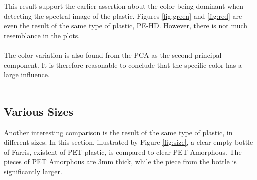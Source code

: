 
\noindent
This result support the earlier assertion about the color being dominant when detecting the spectral image of the plastic. Figures \ref{fig:green} and \ref{fig:red} are even the result of the same type of plastic, PE-HD. However, there is not much resemblance in the plots.
\\\\
The color variation is also found from the PCA as the second principal component. It is therefore reasonable to conclude that the specific color has a large influence.
\\\\
\subsection{Various Sizes}
Another interesting comparison is the result of the same type of plastic, in different sizes. In this section, illustrated by Figure \ref{fig:size}, a clear empty bottle of Farris, existent of PET-plastic, is compared to clear PET Amorphous. The pieces of PET Amorphous are 3mm thick, while the piece from the bottle is significantly larger. 

